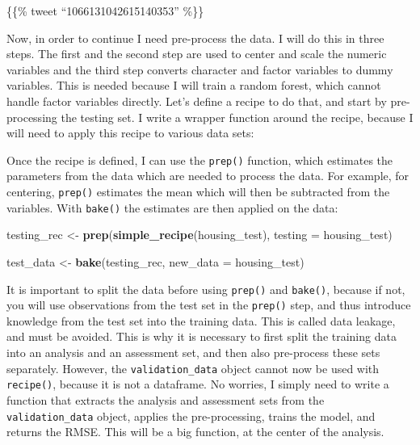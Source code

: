 \documentclass[]{gitbook}
\newenvironment{Shaded}{\begin{snugshade}}{\end{snugshade}}
\newcommand{\ControlFlowTok}[1]{\textcolor[rgb]{0.13,0.29,0.53}{\textbf{#1}}}
\newcommand{\DataTypeTok}[1]{\textcolor[rgb]{0.13,0.29,0.53}{#1}}
\newcommand{\KeywordTok}[1]{\textcolor[rgb]{0.13,0.29,0.53}{\textbf{#1}}}
\newcommand{\NormalTok}[1]{#1}
\newcommand{\OperatorTok}[1]{\textcolor[rgb]{0.81,0.36,0.00}{\textbf{#1}}}
\newcommand{\StringTok}[1]{\textcolor[rgb]{0.31,0.60,0.02}{#1}}
\theoremstyle{definition}
\theoremstyle{definition}
\theoremstyle{definition}
\theoremstyle{remark}
\begin{document}
\{\{\% tweet ``1066131042615140353'' \%\}\}

Now, in order to continue I need pre-process the data. I will do this in
three steps. The first and the second step are used to center and scale
the numeric variables and the third step converts character and factor
variables to dummy variables. This is needed because I will train a
random forest, which cannot handle factor variables directly. Let's
define a recipe to do that, and start by pre-processing the testing set.
I write a wrapper function around the recipe, because I will need to
apply this recipe to various data sets:

\begin{Shaded}
\end{Shaded}

Once the recipe is defined, I can use the \texttt{prep()} function,
which estimates the parameters from the data which are needed to process
the data. For example, for centering, \texttt{prep()} estimates the mean
which will then be subtracted from the variables. With \texttt{bake()}
the estimates are then applied on the data:

\begin{Shaded}
\begin{Highlighting}[]
\NormalTok{testing_rec <-}\StringTok{ }\KeywordTok{prep}\NormalTok{(}\KeywordTok{simple_recipe}\NormalTok{(housing_test), }\DataTypeTok{testing =}\NormalTok{ housing_test)}

\NormalTok{test_data <-}\StringTok{ }\KeywordTok{bake}\NormalTok{(testing_rec, }\DataTypeTok{new_data =}\NormalTok{ housing_test)}
\end{Highlighting}
\end{Shaded}

It is important to split the data before using \texttt{prep()} and
\texttt{bake()}, because if not, you will use observations from the test
set in the \texttt{prep()} step, and thus introduce knowledge from the
test set into the training data. This is called data leakage, and must
be avoided. This is why it is necessary to first split the training data
into an analysis and an assessment set, and then also pre-process these
sets separately. However, the \texttt{validation\_data} object cannot
now be used with \texttt{recipe()}, because it is not a dataframe. No
worries, I simply need to write a function that extracts the analysis
and assessment sets from the \texttt{validation\_data} object, applies
the pre-processing, trains the model, and returns the RMSE. This will be
a big function, at the center of the analysis.
\end{document}

